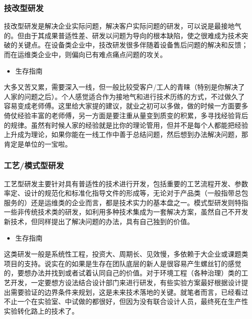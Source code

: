\documentclass[
]{book}
\providecommand{\tightlist}{%
  \setlength{\itemsep}{0pt}\setlength{\parskip}{0pt}}
\begin{document}
\hypertarget{ux6280ux6539ux578bux7814ux53d1}{%
\subsubsection{技改型研发}\label{ux6280ux6539ux578bux7814ux53d1}}

技改型研发是解决企业实际问题，解决客户实际问题的研发，可以说是最接地气的。但由于其成果普适性差、研发以问题为导向的根本缺陷，使之很难成为技术突破的关键点。在设备类企业中，技改研发很多伴随着设备售后问题的解决和反馈；而在运维类企业中，则偏向已有难点痛点问题的攻关。

\begin{itemize}
\tightlist
\item
  生存指南
\end{itemize}

大多又苦又累，需要深入一线，但一般比较受客户/工人的青睐（特别是你解决了人家的问题之后）。个人感觉适合作为接地气和进行技术历练的方式，不过做久了容易变成老师傅。这里给大家提的建议，就业之初可以多做，做的时候一方面要多倚仗经验丰富的老师傅，另一方面是要注重从量变到质变的积累，多寻找经验背后的规律。虽然有时候人家的经验就是比你的理论管用，但并不是每个人都能把经验上升成为理论，如果你能在一线工作中善于总结问题，然后想到办法解决问题，那肯定是单位的一宝啦。

\hypertarget{ux5de5ux827aux6a21ux5f0fux578bux7814ux53d1}{%
\subsubsection{工艺/模式型研发}\label{ux5de5ux827aux6a21ux5f0fux578bux7814ux53d1}}

工艺型研发主要针对具有普适性的技术进行开发，包括重要的工艺流程开发、参数率定、设计的规范化和标准化指导文件的形成等，无论对于产品类（一般指带总包服务的）还是运维类的企业而言，都是技术实力的基本盘之一。模式型研发则特指一些非传统技术类的研发，如利用多种技术集成为一套解决方案，虽然自己不开发新技术，但同样提出了解决问题的办法，具有自己独到的价值。

\begin{itemize}
\tightlist
\item
  生存指南
\end{itemize}

这类研发一般是系统性工程，投资大、周期长、见效慢，多依赖于大企业或课题类项目的支持。说实在的如果是生存在团队底层的新人是很容易产生螺丝钉的感觉的，要想办法并找到或者试着认同自己的价值。对于环境工程（各种治理）类的工艺开发，一定要想方设法结合设计部门来进行研发，有些实验方案最好根据设计提出需要验证的边界条件来规划，这是未来技术落地的关键。就笔者而言，已经看过不止一个在实验室、中试做的都很好，但因为没有联合设计人员，最终死在生产性实验转化路上的技术了。
\end{document}
